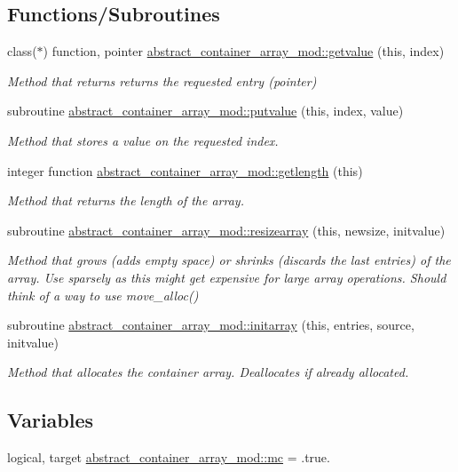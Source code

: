 \subsection*{Functions/\+Subroutines}
\begin{DoxyCompactItemize}
\item 
class($\ast$) function, pointer \mbox{\hyperlink{namespaceabstract__container__array__mod_a2b3e0aec504d76c73bf7f18158924af4}{abstract\+\_\+container\+\_\+array\+\_\+mod\+::getvalue}} (this, index)
\begin{DoxyCompactList}\small\item\em Method that returns returns the requested entry (pointer) \end{DoxyCompactList}\item 
subroutine \mbox{\hyperlink{namespaceabstract__container__array__mod_aae1f6309c51e282a528ce78f128443e0}{abstract\+\_\+container\+\_\+array\+\_\+mod\+::putvalue}} (this, index, value)
\begin{DoxyCompactList}\small\item\em Method that stores a value on the requested index. \end{DoxyCompactList}\item 
integer function \mbox{\hyperlink{namespaceabstract__container__array__mod_a22d71ca3f03bf0bb5d3737338e5e349a}{abstract\+\_\+container\+\_\+array\+\_\+mod\+::getlength}} (this)
\begin{DoxyCompactList}\small\item\em Method that returns the length of the array. \end{DoxyCompactList}\item 
subroutine \mbox{\hyperlink{namespaceabstract__container__array__mod_adb5b2e1692fa90a0239e9a0bcdc7967d}{abstract\+\_\+container\+\_\+array\+\_\+mod\+::resizearray}} (this, newsize, initvalue)
\begin{DoxyCompactList}\small\item\em Method that grows (adds empty space) or shrinks (discards the last entries) of the array. Use sparsely as this might get expensive for large array operations. Should think of a way to use move\+\_\+alloc() \end{DoxyCompactList}\item 
subroutine \mbox{\hyperlink{namespaceabstract__container__array__mod_a793ed0fff6fc6c5823f1e7f119f44959}{abstract\+\_\+container\+\_\+array\+\_\+mod\+::initarray}} (this, entries, source, initvalue)
\begin{DoxyCompactList}\small\item\em Method that allocates the container array. Deallocates if already allocated. \end{DoxyCompactList}\end{DoxyCompactItemize}
\subsection*{Variables}
\begin{DoxyCompactItemize}
\item 
logical, target \mbox{\hyperlink{namespaceabstract__container__array__mod_a536c39baa7114f8ddff2dec5a90a894e}{abstract\+\_\+container\+\_\+array\+\_\+mod\+::mc}} = .true.
\end{DoxyCompactItemize}
